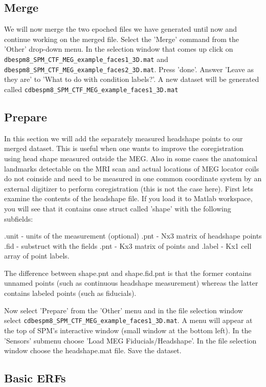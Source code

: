 \subsection{Merge}
We will now merge the two epoched files we have generated until now and continue working on the merged file. Select the 'Merge' command from the 'Other' drop-down menu. In the selection window that comes up click on \verb!dbespm8_SPM_CTF_MEG_example_faces1_3D.mat! and \verb!dbespm8_SPM_CTF_MEG_example_faces2_3D.mat!. Press 'done'. Answer 'Leave as they are' to 'What to do with condition labels?'. A new dataset will be generated called \verb!cdbespm8_SPM_CTF_MEG_example_faces1_3D.mat!

\subsection{Prepare}
In this section we will add the separately measured headshape points to our merged dataset. This is useful when one wants to improve the coregistration using head shape measured outside the MEG. Also in some cases the anatomical landmarks detectable on the MRI scan and actual locations of MEG locator coils do not coinside and need to be measured in one common coordinate system by an external digitizer to perform coregistration (this is not the case here). First lets examine the contents of the headshape file. If you load it to Matlab workspace, you will see that it contains onse struct called 'shape' with the following subfields:

.unit - units of the measurement (optional)
.pnt - Nx3 matrix of headshape points
.fid - substruct with the fields .pnt - Kx3 matrix of points and .label - Kx1 cell array of point labels.


The difference between shape.pnt and shape.fid.pnt is that the former contains unnamed points (such as continuous headshape measurement) whereas the latter contains labeled points (such as fiducials). 

Now select 'Prepare' from the 'Other' menu and in the file selection window select \verb!cdbespm8_SPM_CTF_MEG_example_faces1_3D.mat!. A menu will appear at the top of SPM's interactive window (small window at the bottom left). In the 'Sensors' submenu choose 'Load MEG Fiducials/Headshape'. In the file selection window choose the headshape.mat file. Save the dataset. 


\subsection{Basic ERFs} 

